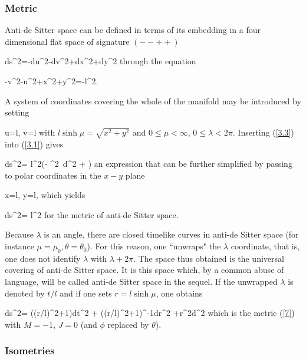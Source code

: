 
\subsubsection{Metric}

Anti-de Sitter space can be defined in terms of its embedding in a
four dimensional flat space of signature $(- -++)$

\bb
ds^2=-du^2-dv^2+dx^2+dy^2
\label{3.1}
\ee
%
through the equation

\bb
-v^2-u^2+x^2+y^2=-l^2.
\label{3.2}
\ee

A system of coordinates covering the whole of the manifold may be
introduced by setting

\bb
u=l\cosh\mu \sin\lambda, \;\;\; v=l\cosh\mu \cos\lambda
\label{3.3}
\ee
%
with $l\sinh\mu=\sqrt{x^2+y^2}$ and $0\leq \mu <\infty$,
$0\leq\lambda <2\pi$.  Inserting (\ref{3.3}) into (\ref{3.1})
gives

\bb
ds^2= l^2\left(- \cosh^2\mu \ d\lambda^2 + \right)
\label{3.4}
\ee
%
an expression that can be further simplified by passing to polar
coordinates in the $x-y$ plane

\bb
x=l\sinh\mu \cos \theta, \;\;\; y=l\sinh \mu \cos \theta,
\label{3.5}
\ee
%
which yields

\bb
ds^2= l^2
\label{3.6}
\ee
%
for the metric of anti-de Sitter space.

Because $\lambda$ is an angle, there are closed timelike curves
in anti-de Sitter space (for instance $\mu=\mu_{0},
\theta =\theta_{0}$). For this reason, one ``unwraps" the $\lambda$
coordinate, that is, one does not identify $\lambda$ with
$\lambda+2\pi$. The space thus obtained is the universal
covering of anti-de Sitter space. It is this space which, by a
common abuse of language, will be called anti-de Sitter space in
the sequel. If the unwrapped $\lambda$ is denoted by $t/l$ and
if one sets $r=l\sinh\mu$, one obtains

\bb
ds^2= ((r/l)^2+1)dt^2 + ((r/l)^2+1)^{-1}dr^2 +r^2d\theta^2
\label{3.6.5}
\ee
%
which is the metric (\ref{7}) with $M=-1$, $J=0$ (and
$\phi$ replaced by $\theta$).


\subsubsection{Isometries}

